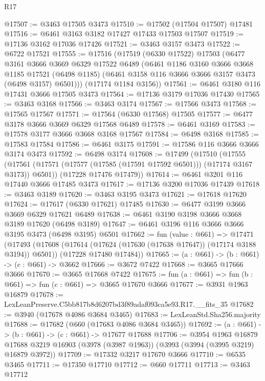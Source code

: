 \begin{lexlean}{R17}
\begin{coremodule}
@17507 := @3463 @17505 @3473
@17510 := @17502 (@17504 @17507) @17481
@17516 := @6461 @3163 @3182 @17427 @17433 @17503 @17507
@17519 := @17136 @3162 @17036 @17426
@17521 := @3463 @3157 @3473
@17522 := @6722 @17521
@17555 := @17516
    (@17519
      (@6330 @17522)
      @17503
      (@6477
        @3161
        @3666
        @3669
        @6329
        @17522
        @6489
        (@6461
          @1186
          @3160
          @3666
          @3668
          @1185
          @17521
          (@6498 @1185)
          (@6461 @3158 @116 @3666 @3666 @3157 @3473 (@6498 @3157) @6501)))
      (@17174 @1184 @3156))
@17561 := @6461 @3180 @116 @17431 @3666 @17505 @3473
@17564 := @17136 @3179 @17036 @17430
@17565 := @3463 @3168
@17566 := @3463 @3174
@17567 := @17566 @3473
@17568 := @17565 @17567
@17571 := @17564 (@6330 @17568) @17505
@17577 := @6477 @3178 @3666 @3669 @6329 @17568 @6489
@17578 := @6461 @3169
@17583 := @17578 @3177 @3666 @3668 @3168 @17567
@17584 := @6498 @3168
@17585 := @17583 @17584
@17586 := @6461 @3175
@17591 := @17586 @116 @3666 @3666 @3174 @3473
@17592 := @6498 @3174
@17608 := @17499
    (@17510
      (@17555 (@17561 (@17571 (@17577 (@17585 (@17591 @17592 @6501))) (@17174 @3167 @3173)) @6501))
      (@17228 @17476 @17479))
@17614 := @6461 @3201 @116 @17440 @3666 @17485 @3473
@17617 := @17136 @3200 @17036 @17439
@17618 := @3463 @3189
@17620 := @3463 @3195 @3473
@17621 := @17618 @17620
@17624 := @17617 (@6330 @17621) @17485
@17630 := @6477 @3199 @3666 @3669 @6329 @17621 @6489
@17638 := @6461 @3190 @3198 @3666 @3668 @3189 @17620 (@6498 @3189)
@17647 := @6461 @3196 @116 @3666 @3666 @3195 @3473 (@6498 @3195) @6501
@17662 := fun (value : @661) =>
  @17471
    (@17493
      (@17608 (@17614 (@17624 (@17630 (@17638 @17647)) (@17174 @3188 @3194)) @6501))
      (@17228 @17480 @17484))
@17665 := (a : @661) -> (b : @661) -> (c : @661) -> @3662
@17666 := @3672 @7422
@17668 := @3665 @17666 @3666
@17670 := @3665 @17668 @7422
@17675 := fun (a : @661) => fun (b : @661) => fun (c : @661) => @3665 @17670 @3666
@17677 := @3931 @1963 @16879
@17678 := LexLeanPreserve.C5bb817b8d6207bd3f89adaf093ca5e93.R17.__fits_35
@17682 := @3940 (@17678 @4086 @3684 @3465)
@17683 := LexLeanStd.Sha256.majority
@17688 := @17682 (@660 (@17683 @4086 @3684 @3465))
@17692 := (a : @661) -> (b : @661) -> (c : @661) -> @17677 @17688
@17706 := @3954
    @1963
    @16879
    @17688
    @3219
    @16903
    (@3978 (@3987 @1963))
    (@3993 (@3994 (@3995 @3219) @16879 @3972))
@17709 := @17332 @3217 @17670 @3666
@17710 := @6535 @3465
@17711 := @17350 @17710
@17712 := @660 @17711
@17713 := @3463 @17712

\end{coremodule}
\end{lexlean}
